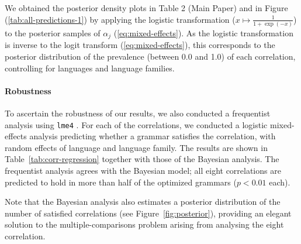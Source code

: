 \documentclass[10pt,twoside,lineno]{article}
\begin{document}
We obtained the posterior density plots in Table 2 (Main Paper) and in Figure (\ref{tab:all-predictions-1}) by applying the logistic transformation ($x \mapsto \frac{1}{1+\exp(-x)}$) to the posterior samples of $\alpha_j$ (\ref{eq:mixed-effects}).
As the logistic transformation is inverse to the logit transform (\ref{eq:mixed-effects}), this corresponds to the posterior distribution of the prevalence (between 0.0 and 1.0) of each correlation, controlling for languages and language families.






\paragraph{Robustness}
To ascertain the robustness of our results, we also conducted a frequentist analysis using \texttt{lme4} \cite{bates2015fitting}.
For each of the correlations, we conducted a logistic mixed-effects analysis predicting whether a grammar satisfies the correlation, with random effects of language and language family.
The results are shown in Table~\ref{tab:corr-regression} together with those of the Bayesian analysis.
The frequentist analysis agrees with the Bayesian model; all eight correlations are predicted to hold in more than half of the optimized grammars ($p < 0.01$ each).

Note that the Bayesian analysis  also estimates a posterior distribution of the number of satisfied correlations (see Figure~\ref{fig:posterior}), providing an elegant solution to the multiple-comparisons problem arising from analysing the eight correlation.



\end{document}

